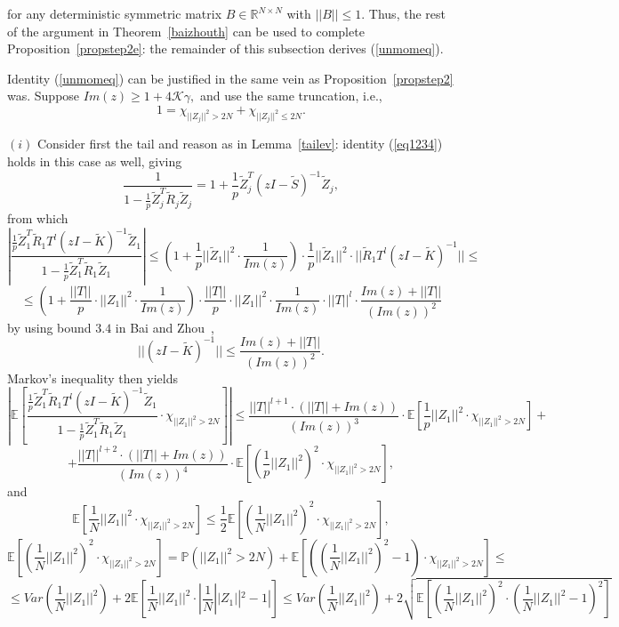 \documentclass{article}
\numberwithin{equation}{section}
\begin{document}
for any deterministic symmetric matrix \(B \in \mathbb{R}^{N \times N}\) with \(||B|| \leq 1.\) Thus, the rest of the argument in Theorem~\ref{baizhouth} can be used to complete Proposition~\ref{propstep2e}: the remainder of this subsection derives (\ref{unmomeq}).
\vspace{0.5cm}
\par
Identity (\ref{unmomeq}) can be justified in the same vein as Proposition~\ref{propstep2} was. Suppose \(Im(z) \geq 1+4\mathcal{K}\gamma,\) and use the same truncation, i.e.,
\[1=\chi_{||Z_j||^2>2N}+\chi_{||Z_j||^2 \leq 2N}.\]
\par
\((i)\) Consider first the tail and reason as in Lemma~\ref{tailev}: identity (\ref{eq1234}) holds in this case as well, giving
\[\frac{1}{1-\frac{1}{p}\tilde{Z}_j^T\tilde{R}_j\tilde{Z}_j}=1+\frac{1}{p}\tilde{Z}_j^T(zI-\tilde{S})^{-1}\tilde{Z}_j,\]
from which
\[|\frac{\frac{1}{p}\tilde{Z}_1^T\tilde{R}_1T^l(zI-\tilde{K})^{-1}\tilde{Z}_1}{1-\frac{1}{p}\tilde{Z}_1^T\tilde{R}_1\tilde{Z}_1}| \leq (1+\frac{1}{p}||\tilde{Z}_1||^2 \cdot \frac{1}{Im(z)}) \cdot \frac{1}{p}||\tilde{Z}_1||^2 \cdot ||\tilde{R}_1T^l(zI-\tilde{K})^{-1}|| \leq\]
\[\leq (1+\frac{||T||}{p} \cdot ||Z_1||^2 \cdot \frac{1}{Im(z)}) \cdot \frac{||T||}{p} \cdot ||Z_1||^2 \cdot \frac{1}{Im(z)} \cdot ||T||^l \cdot \frac{Im(z)+||T||}{(Im(z))^2}\]
by using bound \(3.4\) in Bai and Zhou~\cite{baizhou}, 
\[||(zI-\tilde{K})^{-1}|| \leq \frac{Im(z)+||T||}{(Im(z))^2}.\] 
Markov's inequality then yields
\[|\mathbb{E}[\frac{\frac{1}{p}\tilde{Z}_1^T\tilde{R}_1T^l(zI-\tilde{K})^{-1}\tilde{Z}_1}{1-\frac{1}{p}\tilde{Z}_1^T\tilde{R}_1\tilde{Z}_1} \cdot \chi_{||Z_1||^2>2N}]| \leq \frac{||T||^{l+1}\cdot (||T||+Im(z))}{(Im(z))^3} \cdot \mathbb{E}[\frac{1}{p}||Z_1||^2 \cdot \chi_{||Z_1||^2>2N}]+\]
\[+\frac{||T||^{l+2} \cdot (||T||+Im(z))}{(Im(z))^4} \cdot \mathbb{E}[(\frac{1}{p}||Z_1||^2)^2 \cdot \chi_{||Z_1||^2>2N}],\]
and
\[\mathbb{E}[\frac{1}{N}||Z_1||^2 \cdot \chi_{||Z_1||^2>2N}] \leq \frac{1}{2}\mathbb{E}[(\frac{1}{N}||Z_1||^2)^2 \cdot \chi_{||Z_1||^2>2N}],\]
\[\mathbb{E}[(\frac{1}{N}||Z_1||^2)^2  \cdot\chi_{||Z_1||^2>2N}]=\mathbb{P}(||Z_1||^2>2N)+\mathbb{E}[((\frac{1}{N}||Z_1||^2)^2-1) \cdot \chi_{||Z_1||^2>2N}] \leq\]
\[\leq Var(\frac{1}{N}||Z_1||^2)+2\mathbb{E}[\frac{1}{N}||Z_1||^2 \cdot |\frac{1}{N}||Z_1||^2-1|] \leq Var(\frac{1}{N}||Z_1||^2)+2\sqrt{\mathbb{E}[(\frac{1}{N}||Z_1||^2)^2 \cdot (\frac{1}{N}||Z_1||^2-1)^2]}\]
\end{document}
